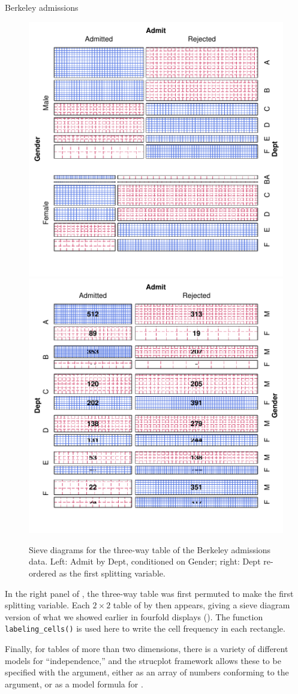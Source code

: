 \documentclass[10pt,krantz2]{krantz}\usepackage[]{graphicx}\usepackage[]{color}
\newenvironment{knitrout}{}{} %
\renewenvironment{knitrout}{\small\renewcommand{\baselinestretch}{.85}}{} %
\begin{document}
\begin{Example}[berkeley3]{Berkeley admissions}
\begin{knitrout}
\begin{figure}[!htbp]
\centerline{\includegraphics[width=.49\textwidth]{ch04/fig/berkeley-sieve-1} 
\includegraphics[width=.49\textwidth]{ch04/fig/berkeley-sieve-2} }

\caption[Sieve diagrams for the three-way table of the Berkeley admissions data]{Sieve diagrams for the three-way table of the Berkeley admissions data. Left: Admit by Dept, conditioned on Gender; right: Dept re-ordered as the first splitting variable.\label{fig:berkeley-sieve}}
\end{figure}


\end{knitrout}
In the right panel of , the three-way table
was first permuted to make  the first splitting variable.
Each $2 \times 2$ table of  by  then appears,
giving a sieve diagram version of what we showed earlier in
fourfold displays ().
The function \verb|labeling_cells()| is
used here to write the cell frequency in each rectangle.

Finally, for tables of more than two dimensions, there is a variety of
different models for ``independence,'' and the strucplot framework
allows these to be specified with the  argument,
either as an array of numbers conforming to the 
argument, or as a model formula for .


\end{Example}
\end{document}
